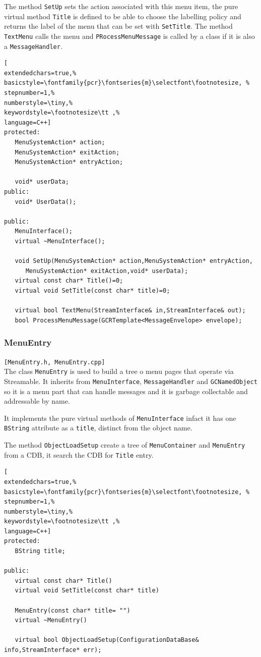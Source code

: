 The method \texttt{SetUp} sets the action associated with this menu item, the pure virtual method \texttt{Title} is defined to be able to choose the labelling policy and returns the label of the menu that can be set with \texttt{SetTitle}. The method \texttt{TextMenu} calls the menu and \texttt{PRocessMenuMessage} is called by a class if it is also a \texttt{MessageHandler}.
\begin{lstlisting}[
extendedchars=true,%
basicstyle=\fontfamily{pcr}\fontseries{m}\selectfont\footnotesize, %
stepnumber=1,%
numberstyle=\tiny,%
keywordstyle=\footnotesize\tt ,%
language=C++]
protected:
   MenuSystemAction* action;
   MenuSystemAction* exitAction;
   MenuSystemAction* entryAction;

   void* userData;
public:
   void* UserData();

public:
   MenuInterface();
   virtual ~MenuInterface();

   void SetUp(MenuSystemAction* action,MenuSystemAction* entryAction,
      MenuSystemAction* exitAction,void* userData);
   virtual const char* Title()=0;
   virtual void SetTitle(const char* title)=0;

   virtual bool TextMenu(StreamInterface& in,StreamInterface& out);
   bool ProcessMenuMessage(GCRTemplate<MessageEnvelope> envelope);
\end{lstlisting}



\subsubsection{MenuEntry}
\texttt{[MenuEntry.h, MenuEntry.cpp]}\\
The class \texttt{MenuEntry} is used to build a tree o menu pages that operate via Streamable. It inherits from \texttt{MenuInterface}, \texttt{MessageHandler} and \texttt{GCNamedObject} so it is a menu part that can handle messages and it is garbage collectable and addressable by name.

It implements the pure virtual methods of \texttt{MenuInterface} infact it has one \texttt{BString} attribute as a \texttt{title}, distinct from the object name.

The method \texttt{ObjectLoadSetup} create a tree of \texttt{MenuContainer} and \texttt{MenuEntry} from a CDB, it search the CDB for \texttt{Title} entry.

\begin{lstlisting}[
extendedchars=true,%
basicstyle=\fontfamily{pcr}\fontseries{m}\selectfont\footnotesize, %
stepnumber=1,%
numberstyle=\tiny,%
keywordstyle=\footnotesize\tt ,%
language=C++]
protected:
   BString title;

public:
   virtual const char* Title()
   virtual void SetTitle(const char* title)

   MenuEntry(const char* title= "")
   virtual ~MenuEntry()

   virtual bool ObjectLoadSetup(ConfigurationDataBase& info,StreamInterface* err);
\end{lstlisting}



